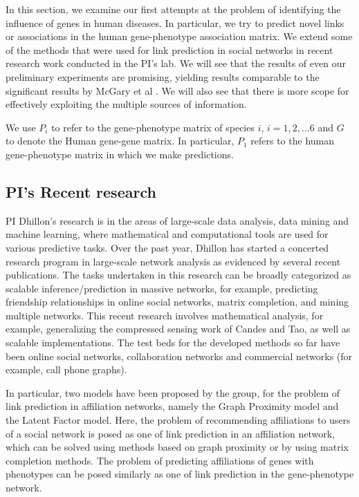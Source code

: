 In this section, we examine our first attempts at the problem of identifying the influence of genes in human diseases. In particular, we try to predict novel links or associations in the human gene-phenotype association matrix. We extend some of the methods that were used for link prediction in social networks in recent research work conducted in the PI's lab. We will see that the results of even our preliminary experiments are promising, yielding results comparable to the significant results by McGary et al \cite{McGaryOrthologousPhenotypes}. We will also see that there is more scope for effectively exploiting the multiple sources of information. 

We use $P_i$ to refer to the gene-phenotype matrix of species $i$, $i = 1, 2, \dots 6$ and $G$ to denote the Human gene-gene matrix. In particular, $P_1$ refers to the human gene-phenotype matrix in which we make predictions.

\subsection{PI's Recent research}
PI Dhillon's research is in the areas of large-scale data analysis, data mining and machine learning, where mathematical and computational tools are used for various predictive tasks. Over the past year, Dhillon has started a concerted research program in large-scale network analysis as evidenced by several recent publications\cite{savasQiuClusteredEmbedding, vasukiNatarajan, berkantSupervised, PrateekSVP, mekaMatrixCompletion,zhengdongAgarwal}. The tasks undertaken in this research can be broadly categorized as scalable inference/prediction in massive networks, for example, predicting friendship relationships in online social networks\cite{savasQiuClusteredEmbedding, vasukiNatarajan}, matrix completion\cite{PrateekSVP, mekaMatrixCompletion}, and mining multiple networks\cite{berkantSupervised}. This recent research involves mathematical analysis, for example, generalizing the compressed sensing work of Candes and Tao, as well as scalable implementations. The test beds for the developed methods so far have been online social networks, collaboration networks and commercial networks (for example, call phone graphs).

In particular, two models have been proposed by the group, for the problem of link prediction in affiliation networks, namely the Graph Proximity model and the Latent Factor model\cite{vasukiNatarajan}. Here, the problem of recommending affiliations to users of a social network is posed as one of link prediction in an affiliation network, which can be solved using methods based on graph proximity or by using matrix completion methods. The problem of predicting affiliations of genes with phenotypes can be posed similarly as one of link prediction in the gene-phenotype network.

